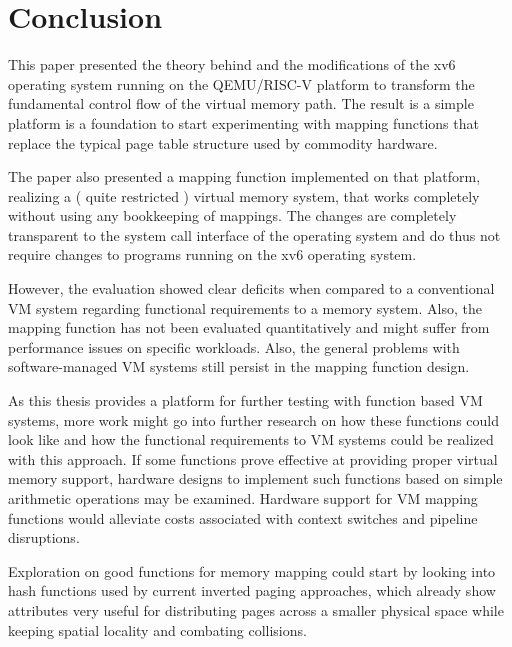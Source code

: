 \chapter{Conclusion}

\label{chap:conclusion}



This paper presented the theory behind and the modifications of the xv6 operating system running on the QEMU/RISC-V platform to transform the fundamental control flow of the virtual memory path. The result is a simple platform is a foundation to start experimenting with mapping functions that replace the typical page table structure used by commodity hardware.

The paper also presented a mapping function implemented on that platform, realizing a ( quite restricted ) virtual memory system, that works completely without using any bookkeeping of mappings. The changes are completely transparent to the system call interface of the operating system and do thus not require changes to programs running on the xv6 operating system.

However, the evaluation showed clear deficits when compared to a conventional VM system regarding functional requirements to a memory system. Also, the mapping function has not been evaluated quantitatively and might suffer from performance issues on specific workloads. Also, the general problems with software-managed VM systems still persist in the mapping function design.

As this thesis provides a platform for further testing with function based VM systems, more work might go into further research on how these functions could look like and how the functional requirements to VM systems could be realized with this approach. If some functions prove effective at providing proper virtual memory support, hardware designs to implement such functions based on simple arithmetic operations may be examined. Hardware support for VM mapping functions would alleviate costs associated with context switches and pipeline disruptions.

Exploration on good functions for memory mapping could start by looking into hash functions used by current inverted paging approaches, which already show attributes very useful for distributing pages across a smaller physical space while keeping spatial locality and combating collisions.